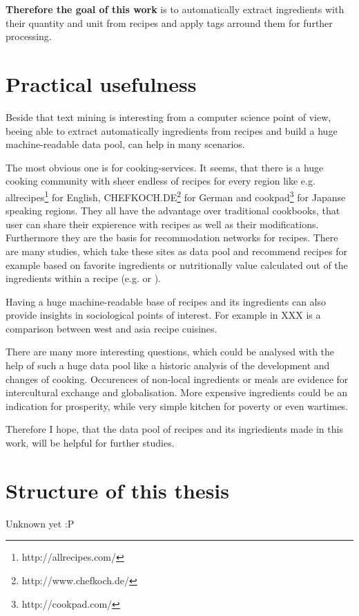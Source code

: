 \documentclass[12pt, twoside]{report}
\begin{document}
\textbf{Therefore the goal of this work} is to automatically extract ingredients with their quantity and unit from recipes and apply tags arround them for further processing.


\section{Practical usefulness}
Beside that text mining is interesting from a computer science point of view, beeing able to extract automatically ingredients from recipes and build a huge machine-readable data pool, can help in many scenarios.

The most obvious one is for cooking-services. It seems, that there is a huge cooking community with sheer endless of recipes for every region like e.g. allrecipes\footnote{http://allrecipes.com/} for English, CHEFKOCH.DE\footnote{http://www.chefkoch.de/} for German and cookpad\footnote{http://cookpad.com/} for Japanse speaking regions. They all have the advantage over traditional cookbooks, that user can share their expierence with recipes as well as their modifications. Furthermore they are the basis for recommodation networks for recipes. There are many studies, which take these sites as data pool and recommend recipes for example based on favorite ingredients or nutritionally value calculated out of the ingredients within a recipe (e.g. \cite{ingredientNetworks} or \cite{recipeRecommendation}).

Having a huge machine-readable base of recipes and its ingredients can also provide insights in sociological points of interest. For example in XXX is a comparison between west and asia recipe cuisines.

There are many more interesting questions, which could be analysed with the help of such a huge data pool like a historic analysis of the development and changes of cooking. Occurences of non-local ingredients or meals are evidence for intercultural exchange and globalisation. More expensive ingredients could be an indication for prosperity, while very simple kitchen for poverty or even wartimes.

Therefore I hope, that the data pool of recipes and its ingriedients made in this work, will be helpful for further studies.

\section{Structure of this thesis}
Unknown yet :P
\end{document}
